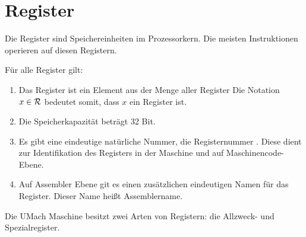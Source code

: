 \section{Register}
\label{sec:Register}

Die Register sind Speichereinheiten im Prozessorkern. Die meisten Instruktionen
operieren auf diesen Registern.

Für alle Register gilt:
\begin{enumerate}
  \item Das Register ist ein Element aus der Menge \Reg aller Register
        \index{\Reg}
    Die Notation $x \in \mathcal{R}$ bedeutet somit, dass $x$ ein Register ist.
  \item Die Speicherkapazität beträgt 32 Bit.
  \item Es gibt eine eindeutige natürliche Nummer, die Registernummer
    . Diese dient zur
    Identifikation des Registers in der Maschine und auf Maschinencode-Ebene.
  \item Auf Assembler Ebene git es einen zusätzlichen eindeutigen Namen für das
    Register. Dieser Name heißt
    Assemblername.
\end{enumerate}

Die UMach Maschine besitzt zwei Arten von Registern: die Allzweck- und
Spezialregister.





